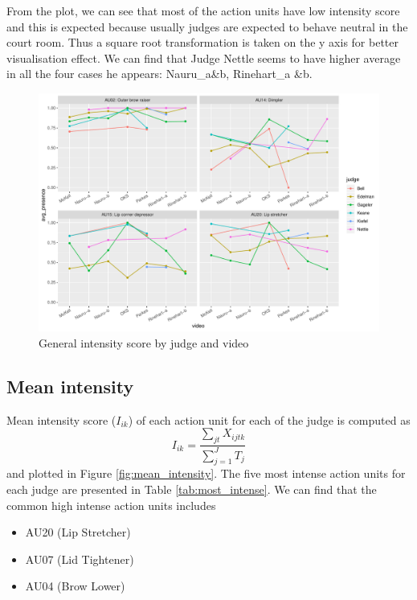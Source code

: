 \documentclass{monashthesis}
\begin{document}
From the plot, we can see that most of the action units have low intensity score and this is expected because usually judges are expected to behave neutral in the court room. Thus a square root transformation is taken on the y axis for better visualisation effect. We can find that Judge Nettle seems to have higher average in all the four cases he appears: Nauru\_a\&b, Rinehart\_a \&b.

\begin{figure}

{\centering \includegraphics[width=1\linewidth]{figures/unnamed-chunk-10-1} 

}

\caption{General intensity score by judge and video\label{fig:intensity}}\label{fig:unnamed-chunk-10}
\end{figure}

\hypertarget{mean-intensity}{%
\subsection{Mean intensity}\label{mean-intensity}}

Mean intensity score (\(I_{ik}\)) of each action unit for each of the judge is computed as \[I_{ik} = \frac{\sum_{jt}X_{ijtk}}{\sum_{j = 1}^JT_j}\] and plotted in Figure \ref{fig:mean_intensity}. The five most intense action units for each judge are presented in Table \ref{tab:most_intense}. We can find that the common high intense action units includes

\begin{itemize}
\tightlist
\item
  AU20 (Lip Stretcher)
\item
  AU07 (Lid Tightener)
\item
  AU04 (Brow Lower)
\end{itemize}
\end{document}
